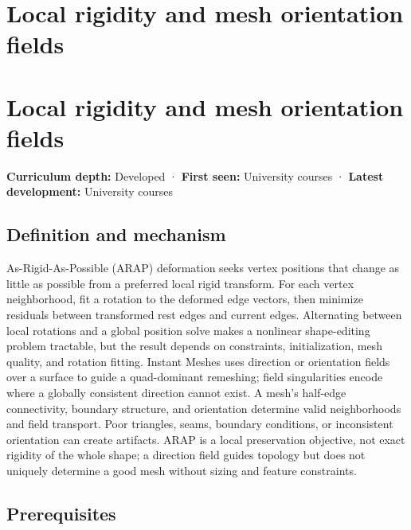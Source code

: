 \hypertarget{appendix-7107009c505b}{}
\section*{Local rigidity and mesh orientation fields}
\section{Local rigidity and mesh orientation fields}\label{appendix-7107009c505b-local-rigidity-and-mesh-orientation-fields}

\textbf{Curriculum depth:} Developed · \textbf{First seen:} University courses · \textbf{Latest development:} University courses

\subsection{Definition and mechanism}\label{appendix-7107009c505b-definition-and-mechanism}

As-Rigid-As-Possible (ARAP) deformation seeks vertex positions that change as little as possible from a preferred local rigid transform. For each vertex neighborhood, fit a rotation to the deformed edge vectors, then minimize residuals between transformed rest edges and current edges. Alternating between local rotations and a global position solve makes a nonlinear shape-editing problem tractable, but the result depends on constraints, initialization, mesh quality, and rotation fitting. Instant Meshes uses direction or orientation fields over a surface to guide a quad-dominant remeshing; field singularities encode where a globally consistent direction cannot exist. A mesh's half-edge connectivity, boundary structure, and orientation determine valid neighborhoods and field transport. Poor triangles, seams, boundary conditions, or inconsistent orientation can create artifacts. ARAP is a local preservation objective, not exact rigidity of the whole shape; a direction field guides topology but does not uniquely determine a good mesh without sizing and feature constraints.

\subsection{Prerequisites}\label{appendix-7107009c505b-prerequisites}

